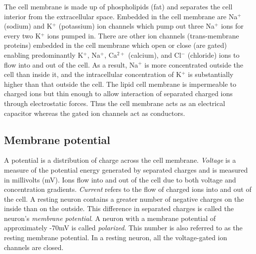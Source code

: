 The cell membrane is made up of phospholipids (fat) and separates the cell interior from the extracellular space. Embedded in the cell membrane are Na$^{+}$ (sodium) and K$^{+}$ (potassium) ion channels which pump out three Na$^{+}$ ions for every two K$^{+}$ ions pumped in. There are other ion channels (trans-membrane proteins) embedded in the cell membrane which
open or close (are gated)  enabling predominantly K$^{+}$, Na$^{+}$, Ca$^{2+}$ (calcium), and Cl$^{-}$ (chloride) ions to flow into and out of the cell. As a result, Na$^{+}$ is more concentrated outside the cell than inside it, and the intracellular concentration of K$^{+}$ is substantially higher than that outside the cell.
The lipid cell membrane is impermeable to charged ions but thin enough to allow interaction
of separated charged ions through electrostatic forces. 
Thus the cell membrane acts as an electrical capacitor whereas the gated ion channels act as conductors.

\subsection{Membrane potential}
A potential is a distribution of charge across the cell membrane.
\textit{Voltage} is a measure of the potential energy generated by separated charges and is measured in millivolts (mV). Ions flow into and out of the cell due to both voltage and concentration gradients. \textit{Current} refers to the flow of charged ions into and out of the cell. A resting neuron contains a greater number of negative charges on the inside than on the outside. 
This difference in separated charges is called the neuron's \textit{membrane potential}. A neuron with a membrane potential of approximately -70mV is called \textit{polarized}. This number is also referred to as the resting membrane potential. In a resting neuron, all the voltage-gated ion channels are closed. 

